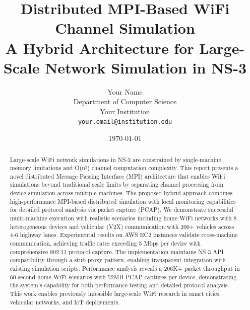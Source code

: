 \documentclass[12pt,a4paper]{article}
\title{
    \Large{\textbf{Distributed MPI-Based WiFi Channel Simulation}} \\
    \large{A Hybrid Architecture for Large-Scale Network Simulation in NS-3}
}
\author{
    Your Name \\
    Department of Computer Science \\
    Your Institution \\
    \texttt{your.email@institution.edu}
}
\date{\today}
\begin{document}
\maketitle

\begin{abstract}
Large-scale WiFi network simulations in NS-3 are constrained by single-machine memory limitations and O(n²) channel computation complexity. This report presents a novel distributed Message Passing Interface (MPI) architecture that enables WiFi simulations beyond traditional scale limits by separating channel processing from device simulation across multiple machines. The proposed hybrid approach combines high-performance MPI-based distributed simulation with local monitoring capabilities for detailed protocol analysis via packet capture (PCAP). We demonstrate successful multi-machine execution with realistic scenarios including home WiFi networks with 8 heterogeneous devices and vehicular (V2X) communication with 200+ vehicles across 4-6 highway lanes. Experimental results on AWS EC2 instances validate cross-machine communication, achieving traffic rates exceeding 5 Mbps per device with comprehensive 802.11 protocol capture. The implementation maintains NS-3 API compatibility through a stub-proxy pattern, enabling transparent integration with existing simulation scripts. Performance analysis reveals a 206K+ packet throughput in 60-second home WiFi scenarios with 52MB PCAP captures per device, demonstrating the system's capability for both performance testing and detailed protocol analysis. This work enables previously infeasible large-scale WiFi research in smart cities, vehicular networks, and IoT deployments.
\end{abstract}

\tableofcontents
\clearpage













\clearpage



\clearpage

\end{document}
